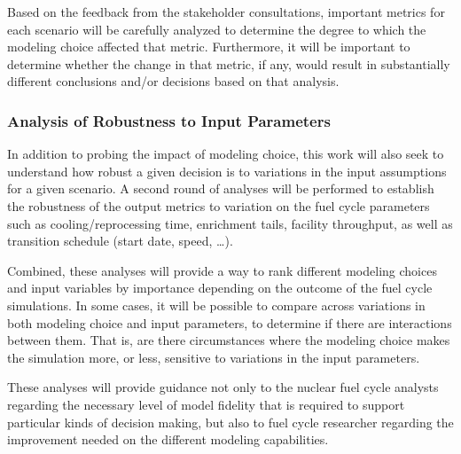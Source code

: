 Based on the feedback from the stakeholder consultations, important metrics
for each scenario will be carefully analyzed to determine the degree to which
the modeling choice affected that metric.  Furthermore, it will be important
to determine whether the change in that metric, if any, would result in
substantially different conclusions and/or decisions based on that analysis.

\subsubsection{Analysis of Robustness to Input Parameters}

In addition to probing the impact of modeling choice, this work will also seek
to understand how robust a given decision is to variations in the input
assumptions for a given scenario.  A second round of analyses will be performed
to establish the robustness of the output metrics to variation on the fuel cycle
parameters such as cooling/reprocessing time, enrichment tails, facility
throughput, as well as transition schedule (start date, speed, \dots).

Combined, these analyses will provide a way to rank different modeling choices
and input variables by importance depending on the outcome of the fuel cycle
simulations.  In some cases, it will be possible to compare across variations
in both modeling choice and input parameters, to determine if there are
interactions between them.  That is, are there circumstances where the
modeling choice makes the simulation more, or less, sensitive to variations in
the input parameters.

These analyses will provide guidance not only to the nuclear fuel cycle analysts
regarding the necessary level of model fidelity that is required to support
particular kinds of decision making, but also to fuel cycle researcher regarding
the improvement needed on the different modeling capabilities.
